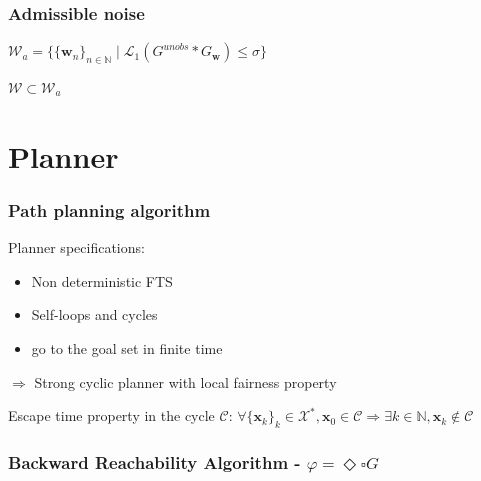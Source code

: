 \documentclass{beamer}
\newcommand{\LTLalways}		{\ensuremath{\square}}
\newcommand{\LTLeventually}	{\ensuremath{\Diamond}}
\newcommand{\vect}[1]{\ensuremath{ \mathbf{#1}}}
\newcommand{\x}{\vect{x}}%
\newcommand{\w}{\vect{w}}%
\begin{document}
\begin{frame}
\frametitle{Admissible noise}

$\mathcal{W}_a = \{ \{\w_n\}_{n\in\mathbb{N}}  \mid \mathcal{L}_1(G^{unobs} \ast G_{\w} ) \leq \sigma \}$

$\mathcal{W} \subset \mathcal{W}_a$

\begin{figure}
\begin{minipage}{0.45\textwidth}
\centering

\end{minipage}
\begin{minipage}{0.45\textwidth}
\centering

\end{minipage}
\end{figure}

\end{frame}

\section{Planner}
\begin{frame}
\frametitle{Path planning algorithm}

Planner specifications:
\begin{itemize}
\pause
\item Non deterministic FTS
\pause
\item Self-loops and cycles
\pause 
\item go to the goal set in finite time
\end{itemize}

\pause
\vspace*{0.5cm}
$\Rightarrow$ Strong cyclic planner with local fairness property

\pause
\vspace*{0.5cm}
Escape time property in the cycle $\mathcal{C}$: 
$\forall \{\x_k\}_k \in \mathcal{X}^*,
\x_0 \in \mathcal{C} \Rightarrow
\exists k\in \mathbb{N},
\x_{k} \notin \mathcal{C}$


\end{frame}


\newcommand{\onlyframe}[2]{%
\only<#1>{%
\def\framenbre{#2}%
%
}%
}
\begin{frame}
\frametitle{Backward Reachability Algorithm - $\varphi = \LTLeventually \LTLalways G$}
\begin{figure}
\onlyframe{1}{2}%
\onlyframe{2}{3}%
\onlyframe{3}{4}%
\onlyframe{4}{5}%
\onlyframe{5}{6}%
\onlyframe{6}{7}%
\end{figure}

\end{frame}
\end{document}
